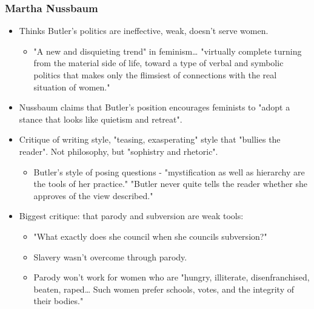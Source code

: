 \documentclass[11pt]{article}
\begin{document}
\subsubsection{Martha Nussbaum}
\label{sec:org6af2bf2}
\begin{itemize}
\item Thinks Butler's politics are ineffective, weak, doesn't serve women.
\begin{itemize}
\item "A new and disquieting trend" in feminism\ldots{} "virtually complete
turning from the material side of life, toward a type of verbal
and symbolic politics that makes only the flimsiest of connections
with the real situation of women."
\end{itemize}
\item Nussbaum claims that Butler's position encourages feminists to
"adopt a stance that looks like quietism and retreat".
\item Critique of writing style, "teasing, exasperating" style that
"bullies the reader". Not philosophy, but "sophistry and rhetoric".
\begin{itemize}
\item Butler's style of posing questions - "mystification as well as
hierarchy are the tools of her practice." "Butler never quite
tells the reader whether she approves of the view described."
\end{itemize}
\item Biggest critique: that parody and subversion are weak tools:
\begin{itemize}
\item "What exactly does she council when she councils subversion?"
\item Slavery wasn't overcome through parody.
\item Parody won't work for women who are "hungry, illiterate,
disenfranchised, beaten, raped\ldots{} Such women prefer schools,
votes, and the integrity of their bodies."
\end{itemize}
\end{itemize}
\end{document}
